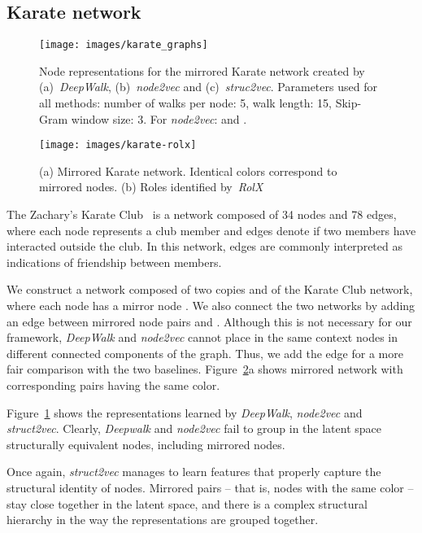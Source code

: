 \documentclass[sigconf]{acmart}
\begin{document}
\subsection{Karate network}

\begin{figure}
\texttt{[image: images/karate\_graphs]}
\caption{Node representations for the mirrored Karate network created by (a)~\textit{DeepWalk}, (b)~\textit{node2vec} and (c)~\textit{struc2vec}. Parameters used for all methods: number of walks per node: 5, walk length: 15, Skip-Gram window size: 3. For \textit{node2vec}:  and .}
\label{karate-embeddings}
\end{figure}

\begin{figure}
\texttt{[image: images/karate-rolx]} 
\caption{(a) Mirrored Karate network. Identical colors correspond to mirrored nodes. (b) Roles identified by~\textit{RolX}}
\label{karate-graph}
\end{figure}

The Zachary's Karate Club~\cite{zachary1977information} is a network composed of 34 nodes and 78 edges, where each node represents a club member and edges denote if two members have interacted outside the club. In this network, edges are commonly interpreted as indications of friendship between members.

We construct a network composed of two copies  and  of the Karate Club network, where each node  has a mirror node . We also connect the two networks by adding an edge between mirrored node pairs  and . Although this is not necessary for our framework, \textit{DeepWalk} and \textit{node2vec} cannot place in the same context nodes in different connected components of the graph. Thus, we add the edge for a more fair comparison with the two baselines. Figure~\ref{karate-graph}a shows mirrored network with corresponding pairs having the same color.

Figure~\ref{karate-embeddings} shows the representations learned by \textit{DeepWalk}, \textit{node2vec} and \textit{struct2vec}. Clearly, \textit{Deepwalk} and \textit{node2vec} fail to group in the latent space structurally equivalent nodes, including mirrored nodes. 

Once again, \textit{struct2vec} manages to learn features that properly capture the structural identity of nodes. Mirrored pairs -- that is, nodes with the same color -- stay close together in the latent space, and there is a complex structural hierarchy in the way the representations are grouped together.
\end{document}
